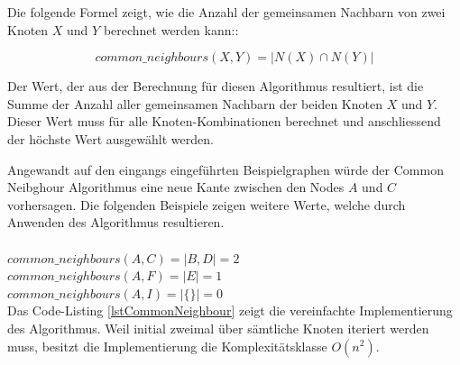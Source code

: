 Die folgende Formel zeigt, wie die Anzahl der gemeinsamen Nachbarn von zwei Knoten $X$ und $Y$ berechnet werden kann::

\begin{equation}
\label{eq:cn}
    common\_neighbours(X,Y) = | N(X) \cap N(Y) |
\end{equation}

Der Wert, der aus der Berechnung für diesen Algorithmus resultiert, ist die Summe der Anzahl aller gemeinsamen
Nachbarn der beiden Knoten $X$ und $Y$. Dieser Wert muss für alle Knoten-Kombinationen berechnet und anschliessend der höchste
Wert ausgewählt werden.

Angewandt auf den eingangs eingeführten Beispielgraphen würde der Common Neibghour Algorithmus eine neue Kante zwischen den Nodes $A$ und $C$ vorhersagen.
Die folgenden Beispiele zeigen weitere Werte, welche durch Anwenden des Algorithmus resultieren.\\
\\
\vspace{4mm}
\newcommand{\forceindent}{\leavevmode{\parindent=2em\indent}}
\forceindent $common\_neighbours(A,C) = |{B, D}| = 2$\\
\vspace{4mm}
\forceindent $common\_neighbours(A,F) = |{E}| = 1$\\
\vspace{4mm}
\forceindent $common\_neighbours(A,I) = |{\{\}}| = 0$\\

Das Code-Listing \ref{lstCommonNeighbour} zeigt die vereinfachte Implementierung des Algorithmus.
Weil initial zweimal über sämtliche Knoten iteriert werden muss, besitzt die Implementierung die Komplexitätsklasse $O(n^2)$.

